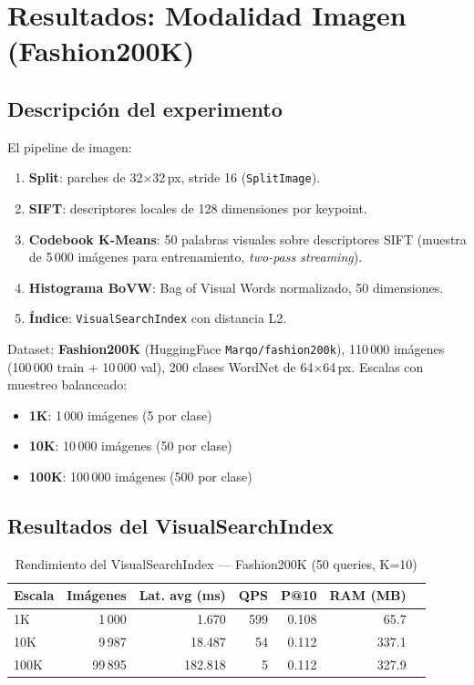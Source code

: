 \documentclass[12pt,a4paper]{article}
\newcommand{\system}[1]{\texttt{\small #1}}
\begin{document}
\section{Resultados: Modalidad Imagen (Fashion200K)}

\subsection{Descripción del experimento}

El pipeline de imagen:
\begin{enumerate}[leftmargin=*, label=\arabic*.]
  \item \textbf{Split}: parches de 32$\times$32\,px, stride 16 (\system{SplitImage}).
  \item \textbf{SIFT}: descriptores locales de 128 dimensiones por keypoint.
  \item \textbf{Codebook K-Means}: 50 palabras visuales sobre descriptores SIFT
        (muestra de 5\,000 imágenes para entrenamiento, \emph{two-pass streaming}).
  \item \textbf{Histograma BoVW}: Bag of Visual Words normalizado, 50 dimensiones.
  \item \textbf{Índice}: \system{VisualSearchIndex} con distancia L2.
\end{enumerate}

\noindent Dataset: \textbf{Fashion200K} (HuggingFace \texttt{Marqo/fashion200k}),
110\,000 imágenes (100\,000 train + 10\,000 val), 200 clases WordNet de 64$\times$64\,px.
Escalas con muestreo balanceado:
\begin{itemize}
  \item \textbf{1K}: 1\,000 imágenes (5 por clase)
  \item \textbf{10K}: 10\,000 imágenes (50 por clase)
  \item \textbf{100K}: 100\,000 imágenes (500 por clase)
\end{itemize}

\subsection{Resultados del VisualSearchIndex}

\begin{table}[H]
  \centering
  \caption{Rendimiento del VisualSearchIndex — Fashion200K (50 queries, K=10)}
  \begin{tabular}{lrrrrrr}
    \toprule
    \textbf{Escala} & \textbf{Imágenes} & \textbf{Lat. avg (ms)} &
    \textbf{QPS} & \textbf{P@10} & \textbf{RAM (MB)} \\
    \midrule
    1K    & 1\,000  & 1.670   & 599   & 0.108 & 65.7  \\
    10K   & 9\,987  & 18.487  & 54    & 0.112 & 337.1 \\
    100K  & 99\,895 & 182.818 & 5     & 0.112 & 327.9 \\
    \bottomrule
  \end{tabular}
  \label{tab:image-custom}
\end{table}
\end{document}
